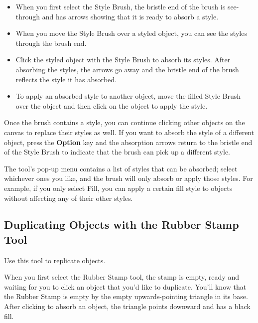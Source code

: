 \documentclass[../main.tex]{subfiles}
\begin{document}

\begin{itemize}
  \item When you first select the Style Brush, the bristle end of the brush is see-through and
    has arrows showing that it is ready to absorb a style.
  \item When you move the Style Brush over a styled object, you can see the styles through the
    brush end.
  \item Click the styled object with the Style Brush to absorb its styles. After absorbing the
    styles, the arrows go away and the bristle end of the brush reflects the style it has
    absorbed.

  \item To apply an absorbed style to another object, move the filled Style Brush over the
    object and then click on the object to apply the style.

\end{itemize}

Once the brush contains a style, you can continue clicking other objects on the canvas to
replace their styles as well. If you want to absorb the style of a different object, press the
\textbf{Option} key and the absorption arrows return to the bristle end of the Style Brush to
indicate that the brush can pick up a different style.


The tool's pop-up menu contains a list of styles that can be absorbed; select whichever ones you
like, and the brush will only absorb or apply those styles. For example, if you only select
Fill, you can apply a certain fill style to objects without affecting any of their other
styles.

\subsection{ Duplicating Objects with the Rubber
Stamp Tool}

Use this tool to replicate objects.

When you first select the Rubber Stamp tool, the stamp is empty, ready and waiting for you to
click an object that you'd like to duplicate. You'll know that the Rubber Stamp is empty by
the empty upwards-pointing triangle in its base. After clicking to absorb an object, the
triangle points downward and has a black fill.
\end{document}
